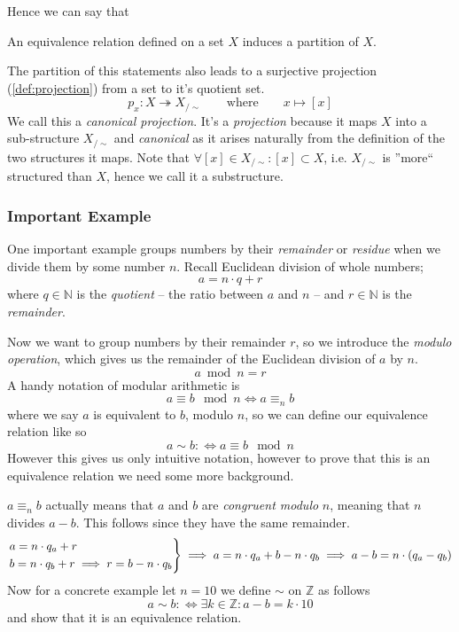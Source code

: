 Hence we can say that
\begin{theorem}\label{thm:equivcls}
   An equivalence relation defined on a set \(X\) induces a partition of \(X\).
\end{theorem}
The partition of this statements also leads to a surjective projection (\ref{def:projection}) from a set to it's quotient set.
\[p_x: X \twoheadrightarrow X_{/\sim} \qquad\text{where}\qquad x \mapsto [x]\]
We call this a \emph{canonical projection}.
It's a \emph{projection} because it maps \(X\) into a sub-structure \(X_{/\sim}\) and \emph{canonical} as it arises naturally from the definition of the two structures it maps.
Note that \(\forall [x] \in X_{/\sim}: [x] \subset X\), i.e. \(X_{/\sim}\) is ''more`` structured than \(X\), hence we call it a substructure.

\subsubsection{Important Example}
One important example groups numbers by their \emph{remainder} or \emph{residue} when we divide them by some number \(n\).
Recall Euclidean division of whole numbers;
\[a = n \cdot q + r\]
where \(q \in \mathbb{N}\) is the \emph{quotient} -- the ratio between \(a\) and \(n\) -- and \(r \in \mathbb{N}\) is the \emph{remainder}.

Now we want to group numbers by their remainder \(r\), so we introduce the \emph{modulo operation}, which gives us the remainder of the Euclidean division of \(a\) by \(n\).
\[a \bmod n = r\]
A handy notation of modular arithmetic is
\[a \equiv b \mod n \iff a \equiv_n b\]
where we say \(a\) is equivalent to \(b\), modulo \(n\), so we can define our equivalence relation like so
\[a \sim b :\iff a \equiv b \mod n\]
However this gives us only intuitive notation, however to prove that this is an equivalence relation we need some more background.

\(a \equiv_n b\) actually means that \(a\) and \(b\) are \emph{congruent modulo} \(n\), meaning that \(n\) divides \(a - b\).
This follows since they have the same remainder.
\[\begin{drcases}a = n \cdot q_a + r\\b = n \cdot q_b + r \implies r = b - n \cdot q_b\end{drcases} \implies a = n \cdot q_a + b - n \cdot q_b \implies a - b = n \cdot (q_a - q_b)\]
Now for a concrete example let \(n = 10\) we define \(\sim\) on \(\mathbb{Z}\) as follows
\[a \sim b :\iff \exists k \in \mathbb{Z}: a - b = k \cdot 10\]
and show that it is an equivalence relation.

